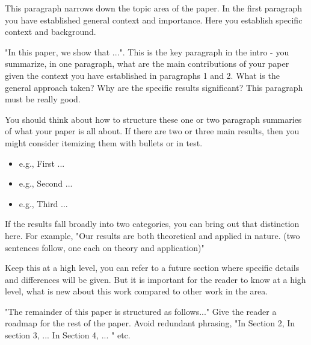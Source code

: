 {}
This paragraph narrows down the topic area of the paper. 
In the first paragraph you have established general context and importance. 
Here you establish specific context and background.

{}
"In this paper, we show that ...". 
This is the key paragraph in the intro - you summarize, 
in one paragraph, 
what are the main contributions of your paper given the context 
you have established in paragraphs 1 and 2. 
What is the general approach taken? 
Why are the specific results significant? 
This paragraph must be really good. 

You should think about how to structure these one or 
two paragraph summaries of what your paper is all about. 
If there are two or three main results, 
then you might consider itemizing them with bullets or in test. 
\begin{itemize}
	\item e.g., First ...
	\item e.g., Second ...
	\item e.g., Third ...
\end{itemize}
If the results fall broadly into two categories, 
you can bring out that distinction here. 
For example, "Our results are both theoretical and applied in nature. 
(two sentences follow, one each on theory and application)"

{}
Keep this at a high level, 
you can refer to a future section where specific details and differences will be given. 
But it is important for the reader to know at a high level, 
what is new about this work compared to other work in the area.

{}
"The remainder of this paper is structured as follows..." 
Give the reader a roadmap for the rest of the paper. 
Avoid redundant phrasing, 
"In Section 2, In section 3, ... In Section 4, ... " etc.


